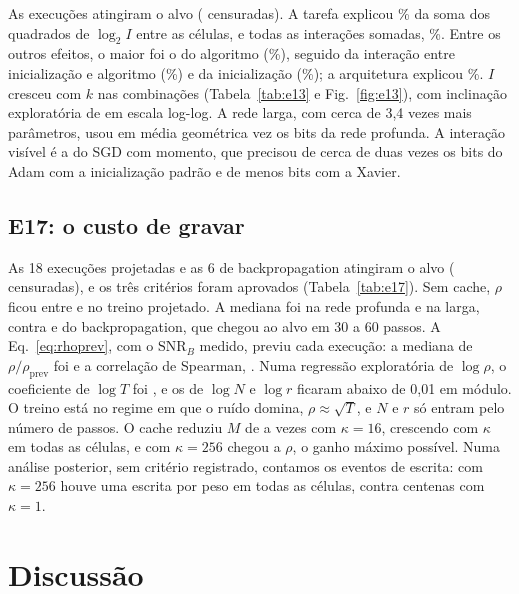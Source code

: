 \documentclass[journal]{IEEEtran}
\newcommand{\SNR}{\mathrm{SNR}}
\begin{document}
As \EtrezeExec{} execuções atingiram o alvo (\EtrezeCens{} censuradas). A tarefa explicou \EtrezeTarefa\% da soma dos quadrados de $\log_2 I$ entre as células, e todas as interações somadas, \EtrezeInter\%. Entre os outros efeitos, o maior foi o do algoritmo (\EtrezeAlg\%), seguido da interação entre inicialização e algoritmo (\EtrezeZG\%) e da inicialização (\EtrezeInit\%); a arquitetura explicou \EtrezeArq\%. $I$ cresceu com $k$ nas \EtrezeHdoze{} combinações (Tabela~\ref{tab:e13} e Fig.~\ref{fig:e13}), com inclinação exploratória de \EtrezeExpK{} em escala log-log. A rede larga, com cerca de 3,4 vezes mais parâmetros, usou em média geométrica \EtrezeRazaoLarga{} vez os bits da rede profunda. A interação visível é a do SGD com momento, que precisou de cerca de duas vezes os bits do Adam com a inicialização padrão e de menos bits com a Xavier.

\subsection{E17: o custo de gravar}

\EdezesseteTabela

As 18 execuções projetadas e as 6 de backpropagation atingiram o alvo (\EdezesseteCens{} censuradas), e os três critérios foram aprovados (Tabela~\ref{tab:e17}). Sem cache, $\rho$ ficou entre \EdezesseteRhoMin{} e \EdezesseteRhoMax{} no treino projetado. A mediana foi \EdezesseteRhoProjProf{} na rede profunda e \EdezesseteRhoProjLarga{} na larga, contra \EdezesseteRhoBpProf{} e \EdezesseteRhoBpLarga{} do backpropagation, que chegou ao alvo em 30 a 60 passos. A Eq.~\eqref{eq:rhoprev}, com o $\SNR_B$ medido, previu cada execução: a mediana de $\rho/\rho_{\text{prev}}$ foi \EdezessetePrevMed{} e a correlação de Spearman, \EdezessetePrevSp. Numa regressão exploratória de $\log\rho$, o coeficiente de $\log T$ foi \EdezessetePrevLogT{}, e os de $\log N$ e $\log r$ ficaram abaixo de 0,01 em módulo. O treino está no regime em que o ruído domina, $\rho \approx \sqrt T$, e $N$ e $r$ só entram pelo número de passos. O cache reduziu $M$ de \EdezesseteGmin{} a \EdezesseteGmax{} vezes com $\kappa = 16$, crescendo com $\kappa$ em todas as células, e com $\kappa = 256$ chegou a $\rho$, o ganho máximo possível. Numa análise posterior, sem critério registrado, contamos os eventos de escrita: com $\kappa = 256$ houve uma escrita por peso em todas as células, contra centenas com $\kappa = 1$.

\section{Discussão}
\end{document}
